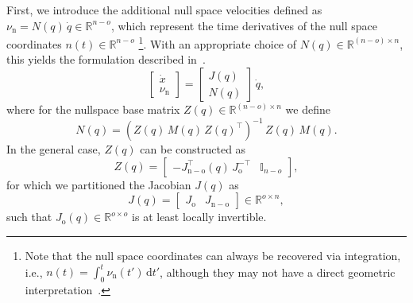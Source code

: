 First, we introduce the additional null space velocities defined as $\nu_\mathrm{n} = N(q) \, \dot{q} \in \mathbb{R}^{n-o}$, which represent the time derivatives of the null space coordinates $n(t) \in \mathbb{R}^{n-o}$ \footnote{Note that the null space coordinates can always be recovered via integration, i.e.,  $n(t) = \int_0^t \nu_\mathrm{n}(t{\prime}) \, \mathrm{d}t{\prime}$, although they may not have a direct geometric interpretation~\citep{ott2008cartesian}.}. With an appropriate choice of  $N(q) \in \mathbb{R}^{(n-o) \times n}$, this yields the formulation described in~\citep{ott2008cartesian, della2020model}.
\begin{equation}
    \begin{bmatrix}
        \dot{x}\\
        \nu_\mathrm{n}
    \end{bmatrix} = \begin{bmatrix}
        J(q)\\
        N(q)
    \end{bmatrix} \, \dot{q},
\end{equation}
where for the nullspace base matrix $Z(q) \in \mathbb{R}^{(n-o) \times n}$ we define~\citep{ott2008cartesian}
\begin{equation}
    N(q) = \left ( Z(q) \, M(q) \, Z(q)^\top \right )^{-1} \, Z(q) \, M(q).
\end{equation}
In the general case, $Z(q)$ can be constructed as~\citep{huang1991optimal, ott2008cartesian}
\begin{equation}
    Z(q) = \begin{bmatrix}
        -J_\mathrm{n-o}^\top(q) \, J_\mathrm{o}^{-\top} & \mathbb{I}_{n-o}
    \end{bmatrix},
\end{equation}
for which we partitioned the Jacobian $J(q)$ as 
\begin{equation}
    J(q) = \begin{bmatrix}
        J_\mathrm{o} & J_\mathrm{n-o}
    \end{bmatrix} \in \mathbb{R}^{o \times n},
\end{equation}
such that $J_\mathrm{o}(q) \in \mathbb{R}^{o \times o}$ is at least locally invertible.

